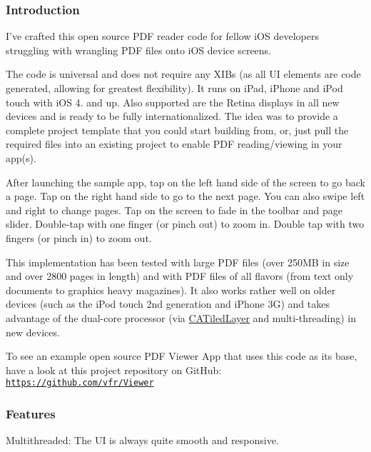 \subsubsection*{Introduction}

I've crafted this open source P\-D\-F reader code for fellow i\-O\-S developers struggling with wrangling P\-D\-F files onto i\-O\-S device screens.

The code is universal and does not require any X\-I\-Bs (as all U\-I elements are code generated, allowing for greatest flexibility). It runs on i\-Pad, i\-Phone and i\-Pod touch with i\-O\-S 4. and up. Also supported are the Retina displays in all new devices and is ready to be fully internationalized. The idea was to provide a complete project template that you could start building from, or, just pull the required files into an existing project to enable P\-D\-F reading/viewing in your app(s).









After launching the sample app, tap on the left hand side of the screen to go back a page. Tap on the right hand side to go to the next page. You can also swipe left and right to change pages. Tap on the screen to fade in the toolbar and page slider. Double-\/tap with one finger (or pinch out) to zoom in. Double tap with two fingers (or pinch in) to zoom out.

This implementation has been tested with large P\-D\-F files (over 250\-M\-B in size and over 2800 pages in length) and with P\-D\-F files of all flavors (from text only documents to graphics heavy magazines). It also works rather well on older devices (such as the i\-Pod touch 2nd generation and i\-Phone 3\-G) and takes advantage of the dual-\/core processor (via \hyperlink{class_c_a_tiled_layer}{C\-A\-Tiled\-Layer} and multi-\/threading) in new devices.

To see an example open source P\-D\-F Viewer App that uses this code as its base, have a look at this project repository on Git\-Hub\-: \href{https://github.com/vfr/Viewer}{\tt https\-://github.\-com/vfr/\-Viewer}

\subsubsection*{Features}

Multithreaded\-: The U\-I is always quite smooth and responsive.

